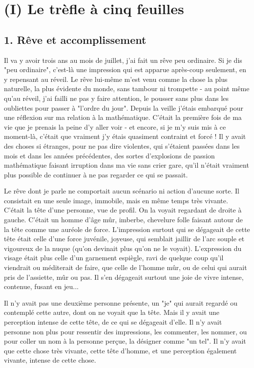 \section{(I) Le trèfle à cinq feuilles}

\subsection*{1. Rêve et accomplissement}

Il va y avoir trois ans au mois de juillet, j'ai fait un rêve peu ordinaire. Si je dis "peu ordinaire", c'est-là une impression qui est apparue après-coup seulement, en y repensant au réveil. Le rêve lui-même m'est venu comme la chose la plus naturelle, la plus évidente du monde, sans tambour ni trompette - au point même qu'au réveil, j'ai failli ne pas y faire attention, le pousser sans plus dans les oubliettes pour passer à "l'ordre du jour". Depuis la veille j'étais embarqué pour une réflexion sur ma relation à la mathématique. C'était la première fois de ma vie que je prenais la peine d'y aller voir - et encore, si je m'y suis mis à ce moment-là, c'était que vraiment j'y étais quasiment contraint et forcé ! Il y avait des choses si étranges, pour ne pas dire violentes, qui s'étaient passées dans les mois et dans les années précédentes, des sortes d'explosions de passion mathématique faisant irruption dans ma vie sans crier gare, qu'il n'était vraiment plus possible de continuer à ne pas regarder ce qui se passait.

Le rêve dont je parle ne comportait aucun scénario ni action d'aucune sorte. Il consistait en une seule image, immobile, mais en même temps très vivante. C'était la tête d'une personne, vue de profil. On la voyait regardant de droite à gauche. C'était un homme d'âge mûr, imberbe, chevelure folle faisant autour de la tête comme une auréole de force. L'impression surtout qui se dégageait de cette tête était celle d'une force juvénile, joyeuse, qui semblait jaillir de l'arc souple et vigoureux de la nuque (qu'on devinait plus qu'on ne le voyait). L'expression du visage était plus celle d'un garnement espiègle, ravi de quelque coup qu'il viendrait ou méditerait de faire, que celle de l'homme mûr, ou de celui qui aurait pris de l'assiette, mûr ou pas. Il s'en dégageait surtout une joie de vivre intense, contenue, fusant en jeu...

Il n'y avait pas une deuxième personne présente, un "je" qui aurait regardé ou contemplé cette autre, dont on ne voyait que la tête. Mais il y avait une perception intense de cette tête, de ce qui se dégageait d'elle. Il n'y avait personne non plus pour ressentir des impressions, les commenter, les nommer, ou pour coller un nom à la personne perçue, la désigner comme "un tel". Il n'y avait que cette chose très vivante, cette tête d'homme, et une perception également vivante, intense de cette chose.

